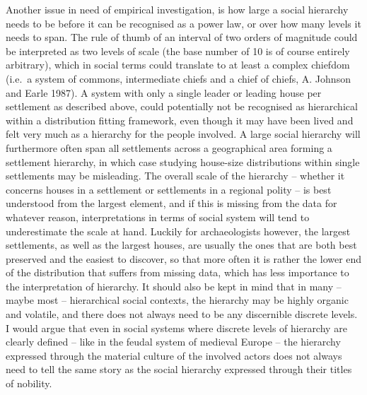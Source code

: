 \documentclass[
  12pt,
  a4paper, twoside]{book}
\begin{document}
Another issue in need of empirical investigation, is how large a social hierarchy needs to be before it can be recognised as a power law, or over how many levels it needs to span. The rule of thumb of an interval of two orders of magnitude could be interpreted as two levels of scale (the base number of 10 is of course entirely arbitrary), which in social terms could translate to at least a complex chiefdom (i.e.~a system of commons, intermediate chiefs and a chief of chiefs, A. Johnson and Earle 1987). A system with only a single leader or leading house per settlement as described above, could potentially not be recognised as hierarchical within a distribution fitting framework, even though it may have been lived and felt very much as a hierarchy for the people involved. A large social hierarchy will furthermore often span all settlements across a geographical area forming a settlement hierarchy, in which case studying house-size distributions within single settlements may be misleading. The overall scale of the hierarchy -- whether it concerns houses in a settlement or settlements in a regional polity -- is best understood from the largest element, and if this is missing from the data for whatever reason, interpretations in terms of social system will tend to underestimate the scale at hand. Luckily for archaeologists however, the largest settlements, as well as the largest houses, are usually the ones that are both best preserved and the easiest to discover, so that more often it is rather the lower end of the distribution that suffers from missing data, which has less importance to the interpretation of hierarchy. It should also be kept in mind that in many -- maybe most -- hierarchical social contexts, the hierarchy may be highly organic and volatile, and there does not always need to be any discernible discrete levels. I would argue that even in social systems where discrete levels of hierarchy are clearly defined -- like in the feudal system of medieval Europe -- the hierarchy expressed through the material culture of the involved actors does not always need to tell the same story as the social hierarchy expressed through their titles of nobility.
\end{document}
